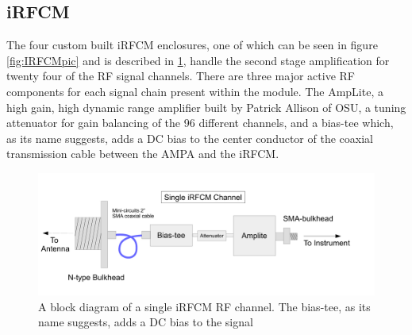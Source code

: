 	\subsection{iRFCM}
	The four custom built iRFCM enclosures, one of which can be seen in figure \ref{fig:IRFCMpic} and is described in \ref{fig:IRFCM}, handle the second stage amplification for twenty four of the RF signal channels.  There are three major active RF components for each signal chain present within the module. The AmpLite, a high gain, high dynamic range amplifier built by Patrick Allison of OSU, a tuning attenuator for gain balancing of the 96 different channels, and a bias-tee which, as its name suggests, adds a DC bias to the center conductor of the coaxial transmission cable between the AMPA and the iRFCM.  

	
\begin{figure}
\centering
	\includegraphics[width=\textwidth]{figures/IRFCM}
	\caption{A block diagram of a single iRFCM RF channel.  The bias-tee, as its name suggests, adds a DC bias to the signal }
	\label{fig:IRFCM}
\end{figure}
	
